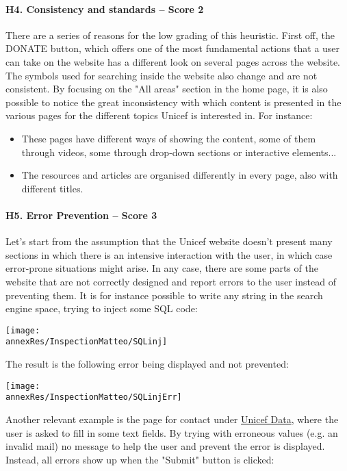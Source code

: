 \paragraph*{H4. Consistency and standards  – Score 2}
There are a series of reasons for the low grading of this heuristic.
First off, the DONATE button, which offers one of the most fundamental actions that a user can take on the website has a different look on several pages across the website.
The symbols used for searching inside the website also change and are not consistent.
By focusing on the "All areas" section in the home page, it is also possible to notice the great inconsistency with which content is presented in the various pages for the different topics Unicef is interested in. For instance:
\begin{itemize}
	\item These pages have different ways of showing the content, some of them through videos, some through drop-down sections or interactive elements...
	\item The resources and articles are organised differently in every page, also with different titles.
	
\end{itemize}

\paragraph*{H5. Error Prevention – Score 3}
Let's start from the assumption that the Unicef website doesn't present many sections in which there is an intensive interaction with the user, in which case error-prone situations might arise. In any case, there are some parts of the website that are not correctly designed and report errors to the user instead of preventing them.
It is for instance possible to write any string in the search engine space, trying to inject some SQL code:

\begin{center}
	\texttt{[image: \\annexRes/InspectionMatteo/SQLinj]}
\end{center}

\noindent
The result is the following error being displayed and not prevented:

\begin{center}
	\texttt{[image: \\annexRes/InspectionMatteo/SQLinjErr]}
\end{center}

Another relevant example is the page for contact under \href{https://data.unicef.org/contact/}{Unicef Data}, where the user is asked to fill in some text fields. By trying with erroneous values (e.g. an invalid mail) no message to help the user and prevent the error is displayed. Instead, all errors show up when the "Submit" button is clicked:

